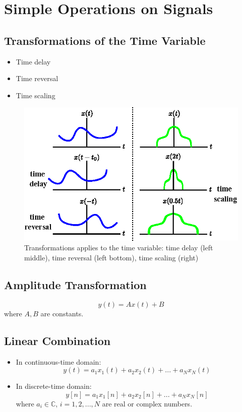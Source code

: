 \section{Simple Operations on Signals}
 \subsection{Transformations of the Time Variable}
 \begin{itemize}
 \item Time delay
 \item Time reversal 
 \item Time scaling
 \end{itemize}
\begin{figure}[H]
    \centering 
    \includegraphics[width=.7\textwidth]{images/transformation.eps}
    \caption{Transformations applies to the time variable: time delay (left middle), time reversal (left bottom), time scaling (right)} 
\end{figure}
  \subsection{Amplitude Transformation}
  \[ y(t) = Ax(t)+B \]
  \quad where $A,B$ are constants.
\subsection{Linear Combination}
\begin{itemize}
\item In continuous-time domain:
\[ y(t) = a_{1}x_{1}(t)+a_{2}x_{2}(t)+...+a_{N}x_{N}(t) \]
\item In discrete-time domain:
\[ y[n] = a_{1}x_{1}[n]+a_{2}x_{2}[n]+...+a_{N}x_{N}[n] \]
 \quad where $a_{i} \in \mathbb{C}$, $i=1,2,...,N$ are real or complex numbers.
\end{itemize}
